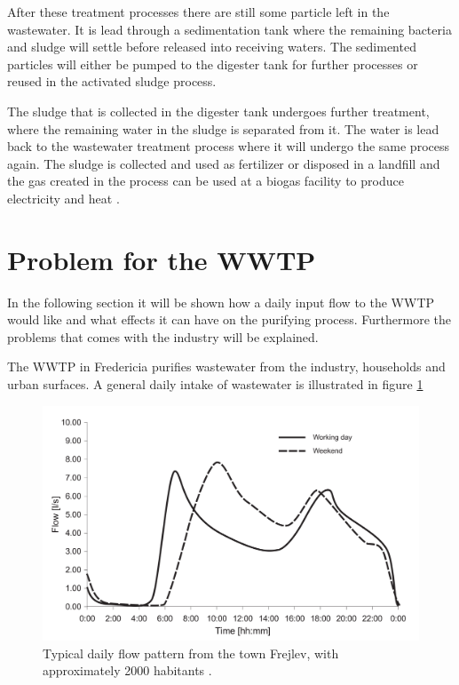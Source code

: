 After these treatment processes there are still some particle left in the wastewater. It is lead through a sedimentation tank where the remaining bacteria and sludge will settle before released into receiving waters. The sedimented particles will either be pumped to the digester tank for further processes or reused in the activated sludge process.


The sludge that is collected in the digester tank undergoes further treatment, where the remaining water in the sludge is separated from it. The water is lead back to the wastewater treatment process where it will undergo the same process again. The sludge is collected and used as fertilizer or disposed in a landfill and the gas created in the process can be used at a biogas facility to produce electricity and heat \cite{wwtp_ekstra}.


\section{Problem for the WWTP}
In the following section it will be shown how a daily input flow to the WWTP would like and what effects it can have on the purifying process. Furthermore the problems that comes with the industry will be explained. 

The WWTP in Fredericia purifies wastewater from the industry, households and urban surfaces. A general daily intake of wastewater is illustrated in figure \ref{fig:input_to_wwtp}  

\begin{figure}[H]
\centering
\includegraphics[width=.6\textwidth]{report/introduction/pictures/poopflow.png}
\caption{Typical daily flow pattern from the town Frejlev, with approximately 2000 habitants \cite{schlutter1999numerical}.}
\label{fig:input_to_wwtp}%
\end{figure} 

